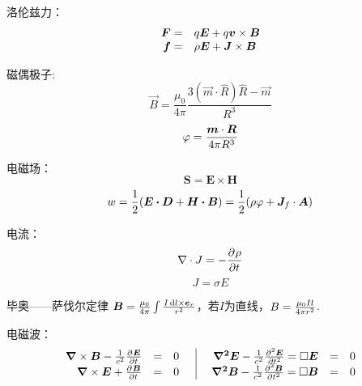 \documentclass[UTF8,9pt]{ctexart}
\begin{document}
洛伦兹力：$$\ar{
    \bm{F}=&q\bm{E}+q\bm{v}\times\bm{B}\\
    \bm{f}=&\rho\bm{E}+\bm{J}\times\bm{B}
}$$

磁偶极子:
$$ 
\vec{B}=\frac{\mu_{0}}{4 \pi} \frac{3(\vec{m} \cdot \widehat{R}) \widehat{R}-\vec{m}}{R^{3}}
 $$
$$\vp = \f{\bm{m}\cdot\bm{R}}{4\pi R^3}$$

电磁场：
$$\bm{S}=\bm{E}\times\bm{H}$$
$$w=\ff{2}(\bm{E\cdot D}+\bm{H\cdot B})=\ff{2}(\rho\vp+\bm{J}_f\cdot\bm{A})$$

电流：
$$\nabla\cdot J=-\pt{\rho}$$
$$J=\sigma E$$

毕奥——萨伐尔定律  $\bm{B}=\frac{\mu_0}{4\pi}\int\frac{I\d l\times \bm{e}_r}{r^2}$，若$I$为直线，$B=\f{\mu_0Il}{4\pi r^2}$.

电磁波：
$$\ar[rcl|rcl]{
    \bm{\nabla}\times \bm{B}-\ff{c^2}\pt{\bm{E}}&=&0\quad&\quad \bm{\nabla^2 E}-\ff{c^2}\pt[2]{\bm{E}}=\square \bm{E}&=&0\\
    \bm{\nabla}\times \bm{E}+\pt{\bm{B}}&=&0&\bm{\nabla^2 B}-\ff{c^2}\pt[2]{\bm{B}}=\square \bm{B}&=&0
}$$
\end{document}
